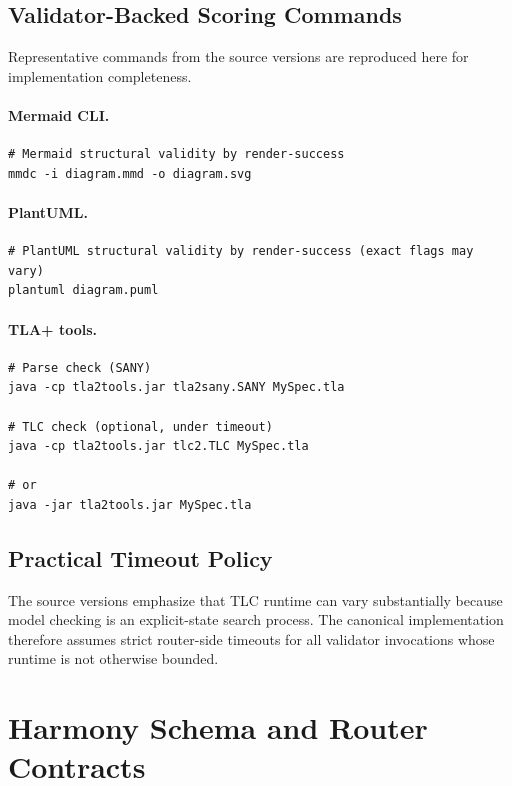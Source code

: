 \documentclass[11pt,a4paper]{article}
\numberwithin{equation}{section}
\theoremstyle{definition}
\begin{document}
\subsection{Validator-Backed Scoring Commands}

Representative commands from the source versions are reproduced here for implementation completeness.

\paragraph{Mermaid CLI.}
\begin{verbatim}
# Mermaid structural validity by render-success
mmdc -i diagram.mmd -o diagram.svg
\end{verbatim}

\paragraph{PlantUML.}
\begin{verbatim}
# PlantUML structural validity by render-success (exact flags may vary)
plantuml diagram.puml
\end{verbatim}

\paragraph{TLA+ tools.}
\begin{verbatim}
# Parse check (SANY)
java -cp tla2tools.jar tla2sany.SANY MySpec.tla

# TLC check (optional, under timeout)
java -cp tla2tools.jar tlc2.TLC MySpec.tla

# or
java -jar tla2tools.jar MySpec.tla
\end{verbatim}

\subsection{Practical Timeout Policy}

The source versions emphasize that TLC runtime can vary substantially because model checking is an explicit-state search process. The canonical implementation therefore assumes strict router-side timeouts for all validator invocations whose runtime is not otherwise bounded.

\section{Harmony Schema and Router Contracts}
\end{document}

